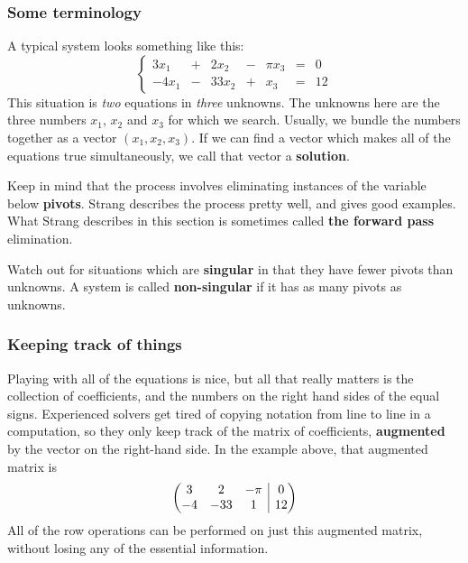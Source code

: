 \documentclass[10pt,]{book}
\makeatletter
\newcommand{\terminology}[1]{\textbf{#1}}
\theoremstyle{plain}
\theoremstyle{definition}
\numberwithin{equation}{section}
\newcommand{\augmatrix}[2]{\left(\begin{array}{@{}#1 |c@{}} #2 \end{array}\right)}
\makeatother
\begin{document}
\subsubsection[Some terminology]{Some terminology}\label{subsubsection-11}
A typical system looks something like this:
          \[
            \left\{ \begin{array}{rrrrrrrr}
                  3 x_1 & +&  2 x_2 & - & \pi x_3 & = & 0 \\
                  -4 x_1 & -& 33 x_2 & + & x_3 & = & 12
                  \end{array}\right.
          \]
          This situation is \emph{two} equations in \emph{three} unknowns.
          The unknowns here are the three numbers \(x_1\), \(x_2\) and
          \(x_3\) for which we search. Usually, we bundle the numbers
          together as a vector \((x_1, x_2, x_3)\). If we can find a vector
          which makes all of the equations true simultaneously, we call that
          vector a \terminology{solution}.
\par

          Keep in mind that the process involves eliminating instances of the
          variable below \terminology{pivots}. Strang describes the process
          pretty well, and gives good examples. What Strang describes in this
          section is sometimes called \terminology{the forward pass} elimination.
\par

          Watch out for situations which are \terminology{singular} in that they
          have fewer pivots than unknowns. A system is called
          \terminology{non-singular} if it has as many pivots as unknowns.
\typeout{************************************************}
\typeout{************************************************}
\subsubsection[Keeping track of things]{Keeping track of things}\label{subsubsection-12}

          Playing with all of the equations is nice, but all that really
          matters is the collection of coefficients, and the numbers on the
          right hand sides of the equal signs. Experienced solvers get tired
          of copying notation from line to line in a computation, so they only
          keep track of the matrix of coefficients, \terminology{augmented} by
          the vector on the right-hand side. In the example above, that
          augmented matrix is
          \[
            \augmatrix{ccc}{
            3 & 2 & -\pi & 0 \\ -4 & -33 & 1 & 12
            }
          \]
          All of the row operations can be performed on just this augmented
          matrix, without losing any of the essential information.
\typeout{************************************************}
\typeout{************************************************}
\end{document}
